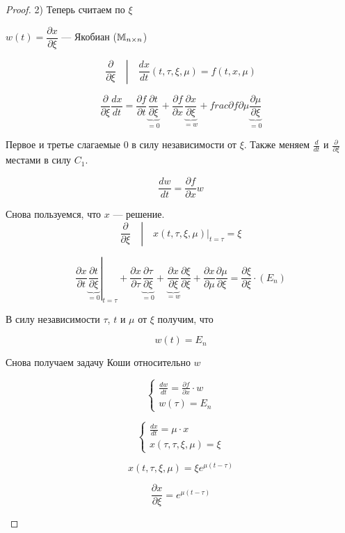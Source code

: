 \begin{proof}
  2) Теперь считаем по $\xi$

  $w(t) = \dfrac{\partial x}{\partial \xi}$ --- Якобиан ($\mathbb{M}_{n \times n}$)

  $$\left. \frac{\partial}{\partial \xi}\quad \right| \quad \frac{dx}{dt}(t, \tau, \xi, \mu) = f(t, x, \mu)$$

  $$\frac{\partial}{\partial \xi} \frac{dx}{dt} =
  \frac{\partial f}{\partial t} \underbrace{\frac{\partial t}{\partial \xi}}_{= 0} +
  \frac{\partial f}{\partial x} \underbrace{\frac{\partial x}{\partial \xi}}_{= w} +
  frac{\partial f}{\partial \mu} \underbrace{\frac{\partial \mu}{\partial \xi}}_{=0}$$
  
  Первое и третье слагаемые 0 в силу независимости от $\xi$. Также меняем $\frac{d}{dt}$ и $\frac{\partial}{\partial \xi}$ местами в силу $C_1$.
  
  $$\frac{dw}{dt} = \frac{\partial f}{\partial x}w$$
  
  Снова пользуемся, что $x$ --- решение.
  $$\left. \frac{\partial}{\partial \xi}\quad \right| \quad x(t, \tau, \xi,\mu) |_{t = \tau} = \xi$$
  
  $$\left.\frac{\partial x}{\partial t} \underbrace{\frac{\partial t}{\partial \xi}}_{=0} \right|_{t = \tau} +
  \frac{\partial x}{\partial \tau} \underbrace{\frac{\partial \tau}{\partial \xi}}_{=0}  +
  \underbrace{\frac{\partial x}{\partial \xi}}_{= w} \frac{\partial \xi}{\partial \xi} +
  \frac{\partial x}{\partial \mu} \frac{\partial \mu}{\partial \xi}  =
  \frac{\partial \xi}{\partial \xi} \cdot (E_n)$$
  
  В силу независимости $\tau$, $t$ и $\mu$ от $\xi$ получим, что

  $$w(t) = E_n$$

  Снова получаем задачу Коши относительно $w$

  $$
  \begin{cases}
    \frac{dw}{dt} = \frac{\partial f}{\partial x} \cdot w \\
    w(\tau) = E_n
  \end{cases}
  $$

  \begin{example}
    $$
    \begin{cases}
      \frac{dx}{dt} = \mu \cdot x \\
      x(\tau, \tau, \xi, \mu) = \xi
    \end{cases}
    $$
  
    $$x(t, \tau, \xi, \mu) = \xi e^{\mu(t - \tau)}$$
  
    $$\frac{\partial x}{\partial \xi} = e^{\mu(t - \tau)}$$
  

\end{example}
\end{proof}
